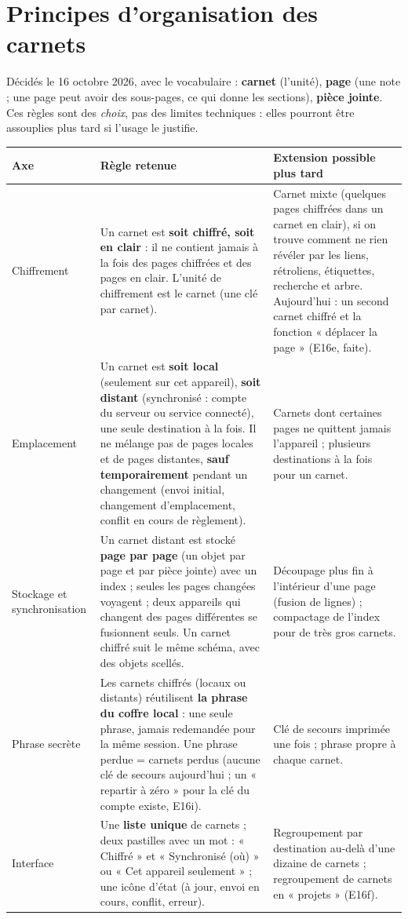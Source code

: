 \documentclass[10pt,a4paper]{article}
\begin{document}
\section{Principes d'organisation des carnets}\label{sec:principes}
Décidés le 16 octobre 2026, avec le vocabulaire : \textbf{carnet} (l'unité), \textbf{page} (une note ; une page peut avoir des sous-pages, ce qui donne les sections), \textbf{pièce jointe}. Ces règles sont des \emph{choix}, pas des limites techniques :
elles pourront être assouplies plus tard si l'usage le justifie.

{\footnotesize\setlength{\tabcolsep}{4pt}\renewcommand{\arraystretch}{1.2}
\begin{longtable}{@{}p{2.6cm} p{7.1cm} p{7.1cm}@{}}
\toprule \textbf{Axe} & \textbf{Règle retenue} & \textbf{Extension possible plus tard}\\ \midrule\endhead
Chiffrement & Un carnet est \textbf{soit chiffré, soit en clair} : il ne contient jamais à la fois des pages chiffrées et des pages en clair. L'unité de chiffrement est le carnet (une clé par carnet). &
Carnet mixte (quelques pages chiffrées dans un carnet en clair), si on trouve comment ne rien révéler par les liens, rétroliens, étiquettes, recherche et arbre. Aujourd'hui : un second carnet chiffré et la fonction « déplacer la page » (E16e, faite). \\ \midrule
Emplacement & Un carnet est \textbf{soit local} (seulement sur cet appareil), \textbf{soit distant} (synchronisé : compte du serveur ou service connecté), une seule destination à la fois. Il ne mélange pas de pages locales et de pages distantes, \textbf{sauf temporairement} pendant un changement (envoi initial, changement d'emplacement, conflit en cours de règlement). &
Carnets dont certaines pages ne quittent jamais l'appareil ; plusieurs destinations à la fois pour un carnet. \\ \midrule
Stockage et synchronisation & Un carnet distant est stocké \textbf{page par page} (un objet par page et par pièce jointe) avec un index ; seules les pages changées voyagent ; deux appareils qui changent des pages différentes se fusionnent seuls. Un carnet chiffré suit le même schéma, avec des objets scellés. &
Découpage plus fin à l'intérieur d'une page (fusion de lignes) ; compactage de l'index pour de très gros carnets. \\ \midrule
Phrase secrète & Les carnets chiffrés (locaux ou distants) réutilisent \textbf{la phrase du coffre local} : une seule phrase, jamais redemandée pour la même session. Une phrase perdue = carnets perdus (aucune clé de secours aujourd'hui ; un « repartir à zéro » pour la clé du compte existe, E16i). &
Clé de secours imprimée une fois ; phrase propre à chaque carnet. \\ \midrule
Interface & Une \textbf{liste unique} de carnets ; deux pastilles avec un mot : « Chiffré » et « Synchronisé (où) » ou « Cet appareil seulement » ; une icône d'état (à jour, envoi en cours, conflit, erreur). &
Regroupement par destination au-delà d'une dizaine de carnets ; regroupement de carnets en « projets » (E16f). \\
\end{longtable}}
\end{document}
